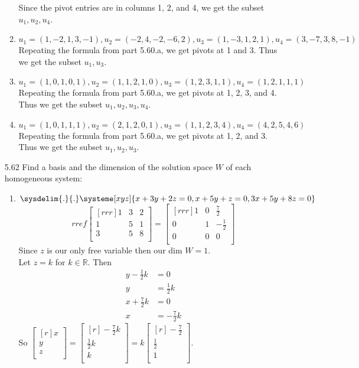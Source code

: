 \documentclass[12pt]{article}
\begin{document}
\begin{enumerate}
\begin{enumerate}
		Since the pivot entries are in columns 1, 2, and 4, we get the subset $u_1,u_2,u_4$.
	\item $u_1=(1,-2,1,3,-1),u_2=(-2,4,-2,-6,2),u_3=(1,-3,1,2,1),u_4=(3,-7,3,8,-1)$\\
		Repeating the formula from part 5.60.a, we get pivots at 1 and 3. Thus we get the subset $u_1,u_3$.
	\item $u_1=(1,0,1,0,1),u_2=(1,1,2,1,0),u_3=(1,2,3,1,1),u_4=(1,2,1,1,1)$\\
		Repeating the formula from part 5.60.a, we get pivots at 1, 2, 3, and 4. Thus we get the subset $u_1,u_2,u_3,u_4$.
	\item $u_1=(1,0,1,1,1),u_2=(2,1,2,0,1),u_3=(1,1,2,3,4),u_4=(4,2,5,4,6)$\\
		Repeating the formula from part 5.60.a, we get pivots at 1, 2, and 3. Thus we get the subset $u_1,u_2,u_3$.
	\end{enumerate}
\item[5.62] Find a basis and the dimension of the solution space $W$ of each homogeneous system:
	\begin{enumerate}
	\item $\sysdelim{.}{.}\systeme[xyz]{x+3y+2z=0,x+5y+z=0,3x+5y+8z=0}$\\
		\[ rref\begin{bmatrix}[rrr]1&3&2\\1&5&1\\3&5&8\\\end{bmatrix}=\begin{bmatrix}[rrr]1&0&\frac{7}{2}\\0&1&-\frac{1}{2}\\0&0&0\\\end{bmatrix} \]
		Since $z$ is our only free variable then our dim $W=1$.\\
		Let $z=k$ for $k\in\mathbb{R}$. Then
		\begin{align*}
		y-\frac{1}{2}k&=0\\
		y&=\frac{1}{2}k\\
		x+\frac{7}{2}k&=0\\
		x&=-\frac{7}{2}k		
		\end{align*} 
		So $\begin{bmatrix}[r]x\\y\\z\\\end{bmatrix}=\begin{bmatrix}[r]-\frac{7}{2}k\\\frac{1}{2}k\\k\\\end{bmatrix}=k\begin{bmatrix}[r]-\frac{7}{2}\\\frac{1}{2}\\1\\\end{bmatrix}$.\\

\end{enumerate}
\end{enumerate}
\end{document}

